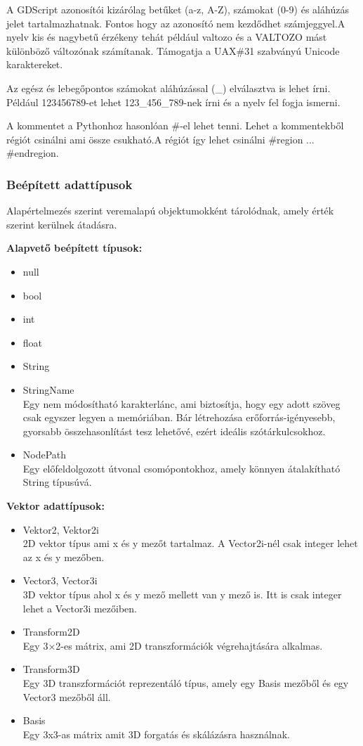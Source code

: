 \documentclass[
]{thesis-ekf}
\theoremstyle{definition}
\theoremstyle{remark}
\begin{document}
A GDScript azonosítói kizárólag betűket (a-z, A-Z), számokat (0-9) és aláhúzás jelet tartalmazhatnak. Fontos hogy az azonosító nem kezdődhet számjeggyel.A nyelv kis és nagybetű érzékeny tehát például valtozo és a VALTOZO mást különböző változónak számítanak. Támogatja a  UAX\#31 szabványú Unicode karaktereket.

Az egész és lebegőpontos számokat aláhúzással (\_) elválasztva is lehet írni. Például 123456789-et lehet 123\_456\_789-nek írni és a nyelv fel fogja ismerni.

A kommentet a Pythonhoz hasonlóan \#-el lehet tenni. Lehet a kommentekből régiót csinálni ami össze csukható.A régiót így lehet csinálni \#region ... \#endregion.

\subsubsection*{Beépített adattípusok}
Alapértelmezés szerint veremalapú objektumokként tárolódnak, amely érték szerint kerülnek átadásra.

\textbf{Alapvető beépített típusok:}
\begin{itemize}
	\item null
	\item bool
	\item int
	\item float
	\item String
	\item StringName \\ Egy nem módosítható karakterlánc, ami biztosítja, hogy egy adott szöveg csak egyszer legyen a memóriában. Bár létrehozása erőforrás-igényesebb, gyorsabb összehasonlítást tesz lehetővé, ezért ideális szótárkulcsokhoz.
	\item NodePath \\ Egy előfeldolgozott útvonal csomópontokhoz, amely könnyen átalakítható String típusúvá. 
\end{itemize}
\textbf{Vektor adattípusok:}
\begin{itemize}
	\item Vektor2, Vektor2i \\ 2D vektor típus ami x és y mezőt tartalmaz. A Vector2i-nél csak integer lehet az x és y mezőben.
	\item Vector3, Vector3i \\ 3D vektor típus ahol x és y mező mellett van y mező is. Itt is csak integer lehet a Vector3i mezőiben.
	\item Transform2D \\ Egy 3×2-es mátrix, ami 2D transzformációk végrehajtására alkalmas. 
	\item Transform3D \\ Egy 3D transzformációt reprezentáló típus, amely egy Basis mezőből és egy Vector3 mezőből áll.
	\item Basis \\ Egy 3x3-as mátrix amit 3D forgatás és skálázásra használnak.
\end{itemize}
\end{document}
